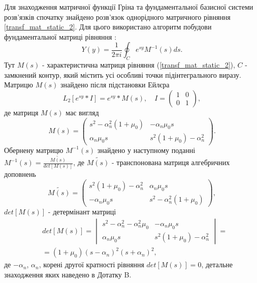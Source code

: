 Для знаходження матричної функції Гріна та фундаментальної базисної системи розв'язків
спочатку знайдено розв'язок однорідного матричного рівняння \eqref{transf_mat_static_2}.
Для цього використано алгоритм побудови фундаментальної матриці рівняння \cite{gantmaher}:
\begin{equation}
    Y(y) = \frac{1}{2\pi i} \oint_C e^{sy} M^{-1}(s)ds.
\end{equation}
Тут $M(s)$ - характеристична матриця рівняння (\ref{transf_mat_static_2}), $C$ - замкнений контур, який містить усі особливі точки підінтегрального виразу.
Матрицю $M(s)$ знайдено після підстановки Ейлєра
\begin{equation}
    L_2\left[ e^{sy}*I \right] = e^{sy} * M(s), \quad I = \begin{pmatrix} 1 & 0 \\ 0 & 1 \end{pmatrix},
\end{equation}
де матриця $M(s)$ має вигляд
\begin{equation}
    M(s) = \begin{pmatrix}
        s^2 -\alpha_n^2(1 + \mu_0) & -\alpha_n \mu_0 s \\
        \alpha_n \mu_0 s & s^2 (1 + \mu_0) -\alpha_n^2
     \end{pmatrix}.
\end{equation}
Обернену матрицю $M^{-1}(s)$ знайдено у наступному поданні $M^{-1}(s) = \frac{\widetilde{M(s)}}{det[M(s)]}$, 
де $\widetilde{M(s)}$ - транспонована матриця алгебричних доповнень
\begin{equation}
    \widetilde{M(s)} = \begin{pmatrix}
        s^2 (1 + \mu_0) -\alpha_n^2 & \alpha_n \mu_0 s \\
        -\alpha_n \mu_0 s & s^2 -\alpha_n^2(1 + \mu_0)
     \end{pmatrix},
\end{equation}
$det[M(s)]$ - детермінант матриці
\begin{align}
    &det[M(s)] = \begin{vmatrix}
        s^2 - \alpha_n^2 - \alpha_n^2\mu_0 & -\alpha_n \mu_0 s \\
        \alpha_n \mu_0 s & s^2 (1 + \mu_0) -\alpha_n^2
     \end{vmatrix} = \nonumber \\
    &=(1+\mu_0)(s - \alpha_n)^2(s + \alpha_n)^2,
\end{align}
де $-\alpha_n$, $\alpha_n$, корені другої кратності рівняння $det[M(s)]=0$, детальне знаходження яких наведено в Дотатку B.

